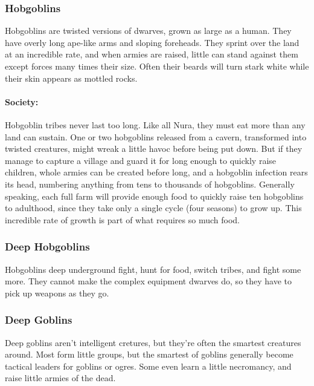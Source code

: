 \subsubsection{Hobgoblins}\label{hobgoblin}
\hobgoblin

Hobgoblins are twisted versions of dwarves, grown as large as a human.  They have overly long ape-like arms and sloping foreheads.  They sprint over the land at an incredible rate, and when armies are raised, little can stand against them except forces many times their size.  Often their beards will turn stark white while their skin appears as mottled rocks.

\paragraph{Society:} Hobgoblin tribes never last too long.  Like all Nura, they must eat more than any land can sustain.  One or two hobgoblins released from a cavern, transformed into twisted creatures, might wreak a little havoc before being put down.  But if they manage to capture a village and guard it for long enough to quickly raise children, whole armies can be created before long, and a hobgoblin infection rears its head, numbering anything from tens to thousands of hobgoblins.  Generally speaking, each full farm will provide enough food to quickly raise ten hobgoblins to adulthood, since they take only a single cycle (four seasons) to grow up.  This incredible rate of growth is part of what requires so much food.
  
\subsubsection{Deep Hobgoblins}\label{deep_hobgoblin}

Hobgoblins deep underground fight, hunt for food, switch tribes, and fight some more.  They cannot make the complex equipment dwarves do, so they have to pick up weapons as they go.

\deephobgoblin

\subsubsection{Deep Goblins}\label{deep_goblin}

Deep goblins aren't intelligent cretures, but they're often the smartest creatures around.  Most form little groups, but the smartest of goblins generally become tactical leaders for goblins or ogres.  Some even learn a little necromancy, and raise little armies of the dead.

